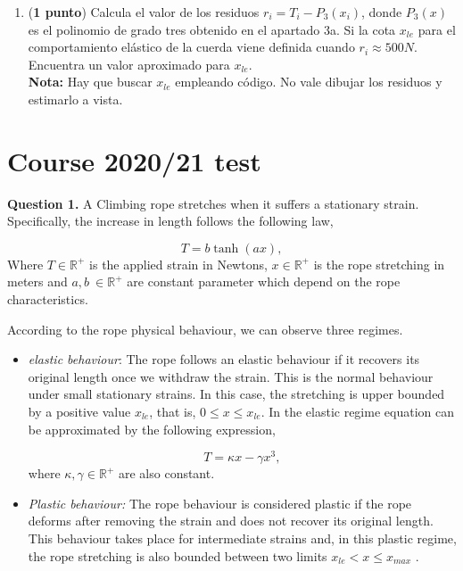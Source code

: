 \begin{paracol}{2}
\begin{enumerate}
\item (\textbf{1 punto}) Calcula el valor de los residuos $r_i = T_i - P_3(x_i)$, donde $P_3(x)$ es el polinomio de grado tres obtenido en el apartado 3a. Si la cota $x_{le}$ para el comportamiento elástico de la cuerda viene definida cuando $r_i \approx 500 N$. Encuentra un valor aproximado para $x_{le}$. \\
\textbf{Nota:} Hay que buscar $x_{le}$ empleando código. No vale dibujar los residuos y estimarlo a vista.
\end{enumerate}

\switchcolumn
\section{Course 2020/21 test}
\noindent \textbf{Question 1.} A Climbing rope stretches when it suffers a stationary strain. Specifically, the increase in length follows the following law,

\begin{equation}\label{eq:0}
	T = b\tanh(ax),
\end{equation}
Where $T \in \mathbb{R}^+$ is the applied strain in Newtons, $x \in \mathbb{R}^+$ is the rope stretching in meters and  $a, b \ \in \mathbb{R}^+$ are constant parameter which depend on the rope characteristics.

According to the rope physical behaviour, we can observe three regimes.

\begin{itemize}
	 \item \emph{elastic behaviour}: The rope follows an elastic behaviour if it recovers its original length once we withdraw the strain. This is the normal behaviour under small stationary strains. In this case, the stretching is upper bounded by a positive value $x_{le}$, that is, $0 \le x \le x_{le}$. In the elastic regime equation \label{eq:0} can be approximated by the following expression,
	
	\begin{equation}\label{eq:1}
		T = \kappa x - \gamma x^3,
	\end{equation}
	where $\kappa, \gamma \in \mathbb{R}^+$ are also constant.
	
	\item \emph{Plastic behaviour:} The rope behaviour is considered plastic if the rope deforms after removing the strain and does not recover its original length. This behaviour takes place for intermediate strains and, in this plastic regime, the rope stretching is also bounded between two limits $x_{le} < x \le x_{max}$ .
	

\end{itemize}
\end{paracol}
